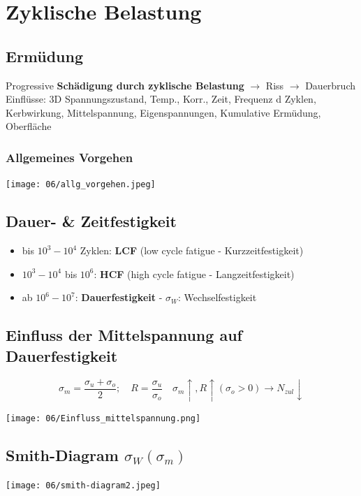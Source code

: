 \section{Zyklische Belastung}
    \subsection{Ermüdung}
        Progressive \textbf{Schädigung durch zyklische Belastung} $\rightarrow$ Riss $\rightarrow$ Dauerbruch\\
        Einflüsse: 3D Spannungszustand, Temp., Korr., Zeit, Frequenz d Zyklen, Kerbwirkung, Mittelspannung, Eigenspannungen, Kumulative Ermüdung, Oberfläche
        \subsubsection{Allgemeines Vorgehen}
            \texttt{[image: 06/allg\_vorgehen.jpeg]}
            \vspace{-2mm}
        \subsection{Dauer- \& Zeitfestigkeit}
            \begin{minipage}{\linewidth}
                \begin{itemize}
                    \item bis $10^3-10^4$ Zyklen: \textbf{LCF} (low cycle fatigue - Kurzzeitfestigkeit)
                    \item $10^3-10^4$ bis $10^6$: \textbf{HCF} (high cycle fatigue - Langzeitfestigkeit)
                    \item ab $10^6-10^7$: \textbf{Dauerfestigkeit} - $\sigma_W$: Wechselfestigkeit
                \end{itemize}
            \end{minipage}
    \subsection{Einfluss der Mittelspannung auf Dauerfestigkeit}
        \[\sigma_m=\frac{\sigma_u+\sigma_o}{2}; \quad R=\frac{\sigma_u}{\sigma_o} \quad \sigma_m \uparrow, R \uparrow (\sigma_o >0) \rightarrow N_{zul} \downarrow\]
        \begin{center}
            \texttt{[image: 06/Einfluss\_mittelspannung.png]}
        \end{center}
    \subsection{Smith-Diagram $\sigma_W(\sigma_m)$}
        \texttt{[image: 06/smith-diagram2.jpeg]}
        \vspace{-2mm}
